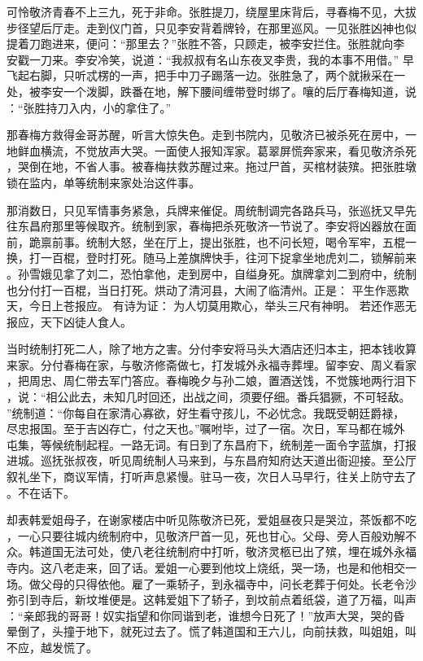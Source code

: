 可怜敬济青春不上三九，死于非命。张胜提刀，绕屋里床背后，寻春梅不见，大拔
步径望后厅走。走到仪门首，只见李安背着牌铃，在那里巡风。一见张胜凶神也似
提着刀跑进来，便问：“那里去？”张胜不答，只顾走，被李安拦住。张胜就向李
安戳一刀来。李安冷笑，说道：“我叔叔有名山东夜叉李贵，我的本事不用借。”
早飞起右脚，只听忒楞的一声，把手中刀子踢落一边。张胜急了，两个就揪采在一
处，被李安一个泼脚，跌番在地，解下腰间缠带登时绑了。嚷的后厅春梅知道，说
：“张胜持刀入内，小的拿住了。”

那春梅方救得金哥苏醒，听言大惊失色。走到书院内，见敬济已被杀死在房中，一
地鲜血横流，不觉放声大哭。一面使人报知浑家。葛翠屏慌奔家来，看见敬济杀死
，哭倒在地，不省人事。被春梅扶救苏醒过来。拖过尸首，买棺材装殡。把张胜墩
锁在监内，单等统制来家处治这件事。

那消数日，只见军情事务紧急，兵牌来催促。周统制调完各路兵马，张巡抚又早先
往东昌府那里等候取齐。统制到家，春梅把杀死敬济一节说了。李安将凶器放在面
前，跪禀前事。统制大怒，坐在厅上，提出张胜，也不问长短，喝令军牢，五棍一
换，打一百棍，登时打死。随马上差旗牌快手，往河下捉拿坐地虎刘二，锁解前来
。孙雪娥见拿了刘二，恐怕拿他，走到房中，自缢身死。旗牌拿刘二到府中，统制
也分付打一百棍，当日打死。烘动了清河县，大闹了临清州。正是：
平生作恶欺天，今日上苍报应。
有诗为证：
为人切莫用欺心，举头三尺有神明。
若还作恶无报应，天下凶徒人食人。

当时统制打死二人，除了地方之害。分付李安将马头大酒店还归本主，把本钱收算
来家。分付春梅在家，与敬济修斋做七，打发城外永福寺葬埋。留李安、周义看家
，把周忠、周仁带去军门答应。春梅晚夕与孙二娘，置酒送饯，不觉簇地两行泪下
，说：“相公此去，未知几时回还，出战之间，须要仔细。番兵猖獗，不可轻敌。
”统制道：“你每自在家清心寡欲，好生看守孩儿，不必忧念。我既受朝廷爵禄，
尽忠报国。至于吉凶存亡，付之天也。”嘱咐毕，过了一宿。次日，军马都在城外
屯集，等候统制起程。一路无词。有日到了东昌府下，统制差一面令字蓝旗，打报
进城。巡抚张叔夜，听见周统制人马来到，与东昌府知府达天道出衙迎接。至公厅
叙礼坐下，商议军情，打听声息紧慢。驻马一夜，次日人马早行，往关上防守去了
。不在话下。

却表韩爱姐母子，在谢家楼店中听见陈敬济已死，爱姐昼夜只是哭泣，茶饭都不吃
，一心只要往城内统制府中，见敬济尸首一见，死也甘心。父母、旁人百般劝解不
众。韩道国无法可处，使八老往统制府中打听，敬济灵柩已出了殡，埋在城外永福
寺内。这八老走来，回了话。爱姐一心要到他坟上烧纸，哭一场，也是和他相交一
场。做父母的只得依他。雇了一乘轿子，到永福寺中，问长老葬于何处。长老令沙
弥引到寺后，新坟堆便是。这韩爱姐下了轿子，到坟前点着纸袋，道了万福，叫声
：“亲郎我的哥哥！奴实指望和你同谐到老，谁想今日死了！”放声大哭，哭的昏
晕倒了，头撞于地下，就死过去了。慌了韩道国和王六儿，向前扶救，叫姐姐，叫
不应，越发慌了。

